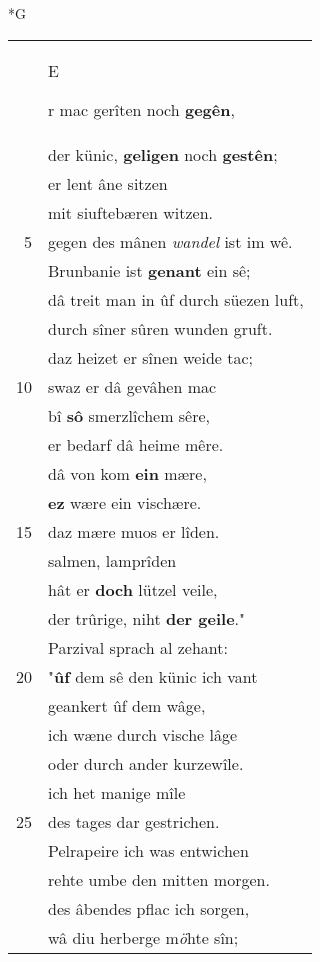 \documentclass[8pt,a4paper,notitlepage]{article}
\begin{document}
\begin{table}[ht]
\begin{minipage}[t]{0.5\linewidth}
\small
\begin{center}*G
\end{center}
\begin{tabular}{rl}
 & \begin{large}E\end{large}r mac gerîten noch \textbf{gegên},\\ 
 & der künic, \textbf{geligen} noch \textbf{gestên};\\ 
 & er lent âne sitzen\\ 
 & mit siuftebæren witzen.\\ 
5 & gegen des mânen \textit{wandel} ist im wê.\\ 
 & Brunbanie ist \textbf{genant} ein sê;\\ 
 & dâ treit man in ûf durch süezen luft,\\ 
 & durch sîner sûren wunden gruft.\\ 
 & daz heizet er sînen weide tac;\\ 
10 & swaz er dâ gevâhen mac\\ 
 & bî \textbf{sô} smerzlîchem sêre,\\ 
 & er bedarf dâ heime mêre.\\ 
 & dâ von kom \textbf{ein} mære,\\ 
 & \textbf{ez} wære ein vischære.\\ 
15 & daz mære muos er lîden.\\ 
 & salmen, lamprîden\\ 
 & hât er \textbf{doch} lützel veile,\\ 
 & der trûrige, niht \textbf{der geile}."\\ 
 & Parzival sprach al zehant:\\ 
20 & "\textbf{ûf} dem sê den künic ich vant\\ 
 & geankert ûf dem wâge,\\ 
 & ich wæne durch vische lâge\\ 
 & oder durch ander kurzewîle.\\ 
 & ich het manige mîle\\ 
25 & des tages dar gestrichen.\\ 
 & Pelrapeire ich was entwichen\\ 
 & rehte umbe den mitten morgen.\\ 
 & des âbendes pflac ich sorgen,\\ 
 & wâ diu herberge m\textit{ö}hte sîn;\\ 

\end{tabular}
\end{minipage}
\end{table}
\end{document}
